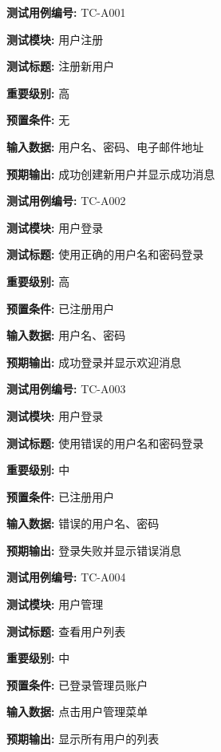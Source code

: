 \begin{framed} \textbf{测试用例编号:} TC-A001

\textbf{测试模块:} 用户注册

\textbf{测试标题:} 注册新用户

\textbf{重要级别:} 高

\textbf{预置条件:} 无

\textbf{输入数据:} 用户名、密码、电子邮件地址

\textbf{预期输出:} 成功创建新用户并显示成功消息

\begin{center}  \end{center} \end{framed}

\begin{framed} \textbf{测试用例编号:} TC-A002

\textbf{测试模块:} 用户登录

\textbf{测试标题:} 使用正确的用户名和密码登录

\textbf{重要级别:} 高

\textbf{预置条件:} 已注册用户

\textbf{输入数据:} 用户名、密码

\textbf{预期输出:} 成功登录并显示欢迎消息

\begin{center}  \end{center} \end{framed}

\begin{framed} \textbf{测试用例编号:} TC-A003

\textbf{测试模块:} 用户登录

\textbf{测试标题:} 使用错误的用户名和密码登录

\textbf{重要级别:} 中

\textbf{预置条件:} 已注册用户

\textbf{输入数据:} 错误的用户名、密码

\textbf{预期输出:} 登录失败并显示错误消息

\begin{center}  \end{center} \end{framed}

\begin{framed} \textbf{测试用例编号:} TC-A004

\textbf{测试模块:} 用户管理

\textbf{测试标题:} 查看用户列表

\textbf{重要级别:} 中

\textbf{预置条件:} 已登录管理员账户

\textbf{输入数据:} 点击用户管理菜单

\textbf{预期输出:} 显示所有用户的列表

\begin{center}  \end{center} \end{framed}

